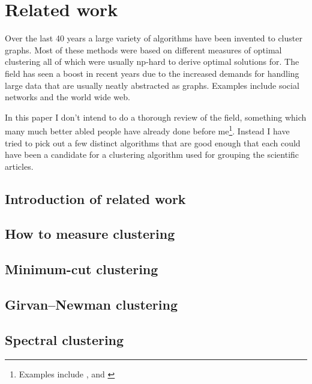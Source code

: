 \section{Related work}

Over the last 40 years a large variety of algorithms have been invented 
to cluster graphs. Most of these methods were based on different 
measures of optimal clustering all of which were usually np-hard to 
derive optimal solutions for. The field has seen a boost in recent years 
due to the increased demands for handling large data that are usually 
neatly abstracted as graphs\cite[p. 2]{fortunato2010}. Examples include 
social networks and the world wide web.

In this paper I don't intend to do a thorough review of the field, 
something which many much better abled people have already done before 
me\footnote{Examples include \cite{newman2004}, \cite{shcaeffer2007} and 
\cite{fortunato2010}}. Instead I have tried to pick out a few distinct 
algorithms that are good enough that each could have been a candidate 
for a clustering algorithm used for grouping the scientific articles.



\subsection{Introduction of related work} %

\subsection{How to measure clustering}

\subsection{Minimum-cut clustering}

\subsection{Girvan–Newman clustering}

\subsection{Spectral clustering}

